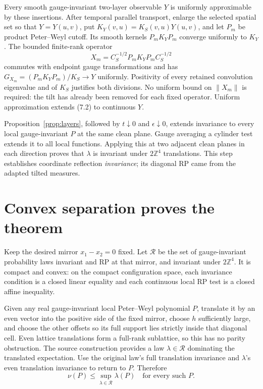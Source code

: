 \documentclass[11pt]{article}
\theoremstyle{remark}
\newcommand{\norm}[1]{\left\|#1\right\|}
\newcommand{\Z}{\mathbb Z}
\begin{document}
Every smooth gauge-invariant two-layer observable $Y$ is uniformly
approximable by these insertions. After temporal parallel transport,
enlarge the selected spatial set so that $Y=Y(u,v)$, put
$K_Y(v,u)=K_S(v,u)Y(u,v)$, and let $P_m$ be product Peter--Weyl
cutoff. Its smooth kernels $P_mK_YP_m$ converge uniformly to $K_Y$.
The bounded finite-rank operator
\[
 X_m=C_S^{-1/2}P_mK_YP_mC_S^{-1/2}
\]
commutes with endpoint gauge transformations and has
$G_{X_m}=(P_mK_YP_m)/K_S\to Y$ uniformly. Positivity of every
retained convolution eigenvalue and of $K_S$ justifies both divisions.
No uniform bound on $\norm{X_m}$ is required: the tilt has already
been removed for each fixed operator. Uniform approximation extends
(7.2) to continuous $Y$.

Proposition~\ref{prop:layers}, followed by $t\downarrow0$ and
$\epsilon\downarrow0$, extends invariance to every local
gauge-invariant $P$ at the same clean plane. Gauge averaging a
cylinder test extends it to all local functions. Applying this
at two adjacent clean planes in each direction proves that
$\lambda$ is invariant under $2\Z^4$ translations. This step
establishes coordinate reflection \emph{invariance}; its diagonal
RP came from the adapted tilted measures.

\section{Convex separation proves the theorem}

Keep the desired mirror $x_1-x_2=0$ fixed. Let $\mathcal R$ be the
set of gauge-invariant probability laws invariant and RP at that
mirror, and invariant under $2\Z^4$. It is compact and convex:
on the compact configuration space, each invariance condition is a
closed linear equality and each continuous local RP test is a closed
affine inequality.

Given any real gauge-invariant local Peter--Weyl polynomial $P$,
translate it by an even vector into the positive side of the fixed
mirror, choose $h$ sufficiently large, and choose the other offsets
so its full support lies strictly inside that diagonal cell.
Even lattice translations form a full-rank sublattice, so this has
no parity obstruction. The source construction provides a law
$\lambda\in\mathcal R$ dominating the translated expectation.
Use the original law's full translation invariance and $\lambda$'s
even translation invariance to return to $P$. Therefore
\[
 \nu(P)\le\sup_{\lambda\in\mathcal R}\lambda(P)
 \quad\text{for every such }P.
 \tag{8.1}
\]
\end{document}
